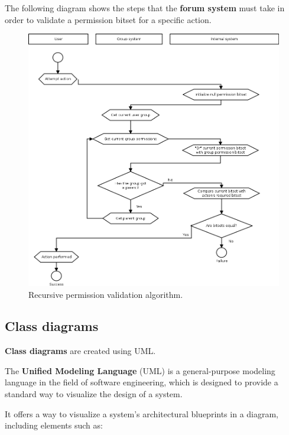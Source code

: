 \documentclass[12pt]{report}
\renewcommand\emph{\textbf}
\begin{document}
                    \newpage

                    The following diagram shows the steps that the \emph{forum system} must take in order to validate a permission bitset for a specific action.

                    \begin{figure}[H]
                    \caption{Recursive permission validation algorithm.}
                    \centering
                    \includegraphics[width=1\textwidth]{dn/0}
                    \end{figure}

                    \newpage
                    \newpage

                \subsection{Class diagrams}

                    \emph{Class diagrams} are created using UML.

                    The \emph{Unified Modeling Language} (UML) is a general-purpose modeling language in the field of software engineering, which is designed to provide a standard way to visualize the design of a system.
                    
                    It offers a way to visualize a system's architectural blueprints in a diagram, including elements such as:
\end{document}
